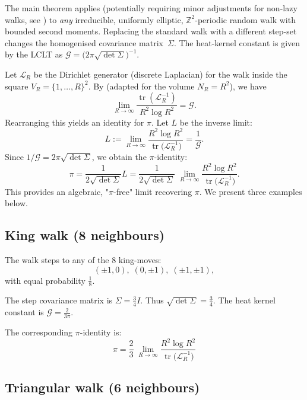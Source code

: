 \documentclass{article}
\numberwithin{equation}{section}
\theoremstyle{definition}
\theoremstyle{remark}
\newcommand{\cG}{\mathcal{G}}
\DeclareMathOperator{\tr}{tr}
\begin{document}
The main theorem applies (potentially requiring minor adjustments for non-lazy walks, see ) to \emph{any} irreducible, uniformly elliptic,
$\mathbb{Z}^{2}$-periodic random walk with bounded second moments.
Replacing the standard walk with a different step-set changes
the homogenised covariance matrix~$\Sigma$. The heat-kernel constant is given by the LCLT as
\(\displaystyle\cG=\bigl(2\pi\sqrt{\det\Sigma}\bigr)^{-1}\).

Let \( \mathcal{L}_R \) be the Dirichlet generator
(discrete Laplacian) for the walk inside the square \( V_R = \{1,\dots,R\}^2 \).
By  (adapted for the volume $N_R=R^2$), we have
\[
\lim_{R\to\infty} \frac{\tr(\mathcal{L}_R^{-1})}{R^2 \log R^2} = \cG.
\]
Rearranging this yields an identity for $\pi$. Let $L$ be the inverse limit:
\[L := \lim_{R\to\infty}\frac{R^{2}\log R^{2}}{\tr\!\bigl(\mathcal{L}_R^{-1}\bigr)} = \frac{1}{\cG}.\]
Since $1/\cG = 2\pi\sqrt{\det\Sigma}$, we obtain the $\pi$-identity:
\[\pi = \frac{1}{2\sqrt{\det\Sigma}} L = \frac{1}{2\sqrt{\det\Sigma}}\;\lim_{R\to\infty}\frac{R^{2}\log R^{2}}{\tr\!\bigl(\mathcal{L}_R^{-1}\bigr)}.\]
This provides an algebraic, "$\pi$-free" limit recovering $\pi$. We present three examples below.

\subsection{King walk (8 neighbours)}\label{app:king}

The walk steps to any of the 8 king-moves:
\[
(\pm1,0),\;(0,\pm1),\;(\pm1,\pm1),
\]
with equal probability \( \tfrac18 \).

The step covariance matrix is $\Sigma = \tfrac{3}{4} I$. Thus $\sqrt{\det\Sigma} = \frac{3}{4}$.
The heat kernel constant is \( \cG = \frac{2}{3\pi} \).

The corresponding $\pi$-identity is:
\begin{equation}\label{eq:King_pi}
\boxed{\;\displaystyle \pi=\frac{2}{3}\;\lim_{R\to\infty}\frac{R^{2}\log R^{2}}{\tr\!\bigl(\mathcal{L}_R^{-1}\bigr)}\;}
\end{equation}

\subsection{Triangular walk (6 neighbours)}\label{app:tri}
\end{document}
